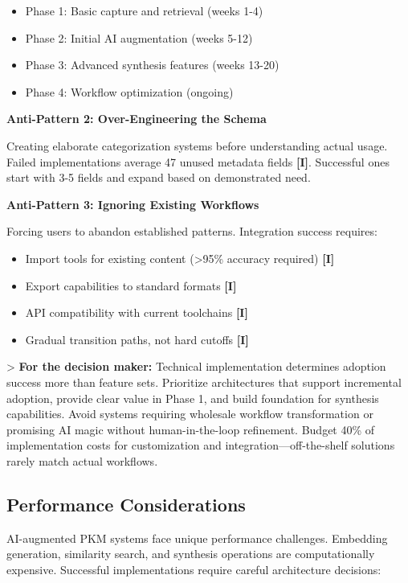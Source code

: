 \documentclass[a4paper,11pt]{article}
\newcommand{\ilabel}{\textbf{\textcolor{icolor}{[I]}}}
\begin{document}
\begin{itemize}
  \item Phase 1: Basic capture and retrieval (weeks 1-4)
  \item Phase 2: Initial AI augmentation (weeks 5-12)
  \item Phase 3: Advanced synthesis features (weeks 13-20)
  \item Phase 4: Workflow optimization (ongoing)
\end{itemize}

\textbf{Anti-Pattern 2: Over-Engineering the Schema}\par
Creating elaborate categorization systems before understanding actual usage. Failed implementations average 47 unused metadata fields \ilabel{}. Successful ones start with 3-5 fields and expand based on demonstrated need.


\textbf{Anti-Pattern 3: Ignoring Existing Workflows}\par
Forcing users to abandon established patterns. Integration success requires:

\begin{itemize}
  \item Import tools for existing content (>95\% accuracy required) \ilabel{}
  \item Export capabilities to standard formats \ilabel{}
  \item API compatibility with current toolchains \ilabel{}
  \item Gradual transition paths, not hard cutoffs \ilabel{}
\end{itemize}

> \textbf{For the decision maker:} Technical implementation determines adoption success more than feature sets. Prioritize architectures that support incremental adoption, provide clear value in Phase 1, and build foundation for synthesis capabilities. Avoid systems requiring wholesale workflow transformation or promising AI magic without human-in-the-loop refinement. Budget 40\% of implementation costs for customization and integration—off-the-shelf solutions rarely match actual workflows.


\subsection{Performance Considerations}

AI-augmented PKM systems face unique performance challenges. Embedding generation, similarity search, and synthesis operations are computationally expensive. Successful implementations require careful architecture decisions:
\end{document}
